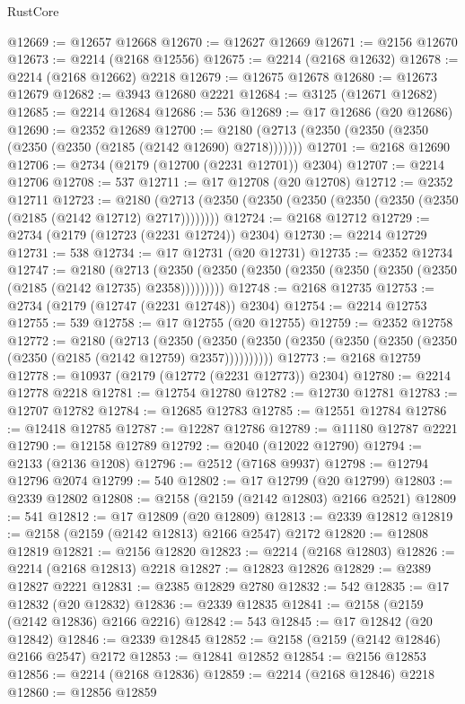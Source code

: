 \begin{lexlean}{RustCore}
\begin{coremodule}
@12669 := @12657 @12668
@12670 := @12627 @12669
@12671 := @2156 @12670
@12673 := @2214 (@2168 @12556)
@12675 := @2214 (@2168 @12632)
@12678 := @2214 (@2168 @12662) @2218
@12679 := @12675 @12678
@12680 := @12673 @12679
@12682 := @3943 @12680 @2221
@12684 := @3125 (@12671 @12682)
@12685 := @2214 @12684
@12686 := 536
@12689 := @17 @12686 (@20 @12686)
@12690 := @2352 @12689
@12700 := @2180 (@2713 (@2350 (@2350 (@2350 (@2350 (@2350 (@2185 (@2142 @12690) @2718)))))))
@12701 := @2168 @12690
@12706 := @2734 (@2179 (@12700 (@2231 @12701)) @2304)
@12707 := @2214 @12706
@12708 := 537
@12711 := @17 @12708 (@20 @12708)
@12712 := @2352 @12711
@12723 := @2180 (@2713 (@2350 (@2350 (@2350 (@2350 (@2350 (@2350 (@2185 (@2142 @12712) @2717))))))))
@12724 := @2168 @12712
@12729 := @2734 (@2179 (@12723 (@2231 @12724)) @2304)
@12730 := @2214 @12729
@12731 := 538
@12734 := @17 @12731 (@20 @12731)
@12735 := @2352 @12734
@12747 := @2180
    (@2713 (@2350 (@2350 (@2350 (@2350 (@2350 (@2350 (@2350 (@2185 (@2142 @12735) @2358)))))))))
@12748 := @2168 @12735
@12753 := @2734 (@2179 (@12747 (@2231 @12748)) @2304)
@12754 := @2214 @12753
@12755 := 539
@12758 := @17 @12755 (@20 @12755)
@12759 := @2352 @12758
@12772 := @2180
    (@2713
      (@2350 (@2350 (@2350 (@2350 (@2350 (@2350 (@2350 (@2350 (@2185 (@2142 @12759) @2357))))))))))
@12773 := @2168 @12759
@12778 := @10937 (@2179 (@12772 (@2231 @12773)) @2304)
@12780 := @2214 @12778 @2218
@12781 := @12754 @12780
@12782 := @12730 @12781
@12783 := @12707 @12782
@12784 := @12685 @12783
@12785 := @12551 @12784
@12786 := @12418 @12785
@12787 := @12287 @12786
@12789 := @11180 @12787 @2221
@12790 := @12158 @12789
@12792 := @2040 (@12022 @12790)
@12794 := @2133 (@2136 @1208)
@12796 := @2512 (@7168 @9937)
@12798 := @12794 @12796 @2074
@12799 := 540
@12802 := @17 @12799 (@20 @12799)
@12803 := @2339 @12802
@12808 := @2158 (@2159 (@2142 @12803) @2166 @2521)
@12809 := 541
@12812 := @17 @12809 (@20 @12809)
@12813 := @2339 @12812
@12819 := @2158 (@2159 (@2142 @12813) @2166 @2547) @2172
@12820 := @12808 @12819
@12821 := @2156 @12820
@12823 := @2214 (@2168 @12803)
@12826 := @2214 (@2168 @12813) @2218
@12827 := @12823 @12826
@12829 := @2389 @12827 @2221
@12831 := @2385 @12829 @2780
@12832 := 542
@12835 := @17 @12832 (@20 @12832)
@12836 := @2339 @12835
@12841 := @2158 (@2159 (@2142 @12836) @2166 @2216)
@12842 := 543
@12845 := @17 @12842 (@20 @12842)
@12846 := @2339 @12845
@12852 := @2158 (@2159 (@2142 @12846) @2166 @2547) @2172
@12853 := @12841 @12852
@12854 := @2156 @12853
@12856 := @2214 (@2168 @12836)
@12859 := @2214 (@2168 @12846) @2218
@12860 := @12856 @12859

\end{coremodule}
\end{lexlean}
